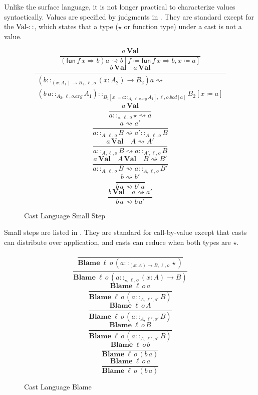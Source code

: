 Unlike the surface language, it is not longer practical to characterize values syntactically.
Values are specified by judgments in . 
They are standard except for the $\operatorname{Val-::}$, which states that a type ($\star$ or function type) under a cast is not a value.

\begin{figure}
\[
\frac{a\,\textbf{Val}}{\left(\mathsf{fun}\,f\,x\Rightarrow b\right)a\rightsquigarrow b\left[f\coloneqq\mathsf{fun}\,f\,x\Rightarrow b,x\coloneqq a\right]}
\]
\[
\frac{b\,\textbf{Val}\quad a\,\textbf{Val}}{\begin{array}{c}
\left(b::_{\left(x:A_{1}\right)\rightarrow B_{1},\ensuremath{\ell},o}\left(x:A_{2}\right)\rightarrow B_{2}\right)a\rightsquigarrow\\
\left(b\,a::_{A_{2},\ell,o.arg}A_{1}\right)::_{B_{1}\left[x\coloneqq a::_{A_{2},\ell,o.arg}A_{1}\right],\ensuremath{\ell},o.bod[a]}B_{2}\left[x\coloneqq a\right]
\end{array}}
\]
\[
\frac{a\,\textbf{Val}}{a::_{\star,\ensuremath{\ell},o}\star\rightsquigarrow a}
\]
\[
\frac{a\rightsquigarrow a'}{a::_{A,\ensuremath{\ell},o}B\rightsquigarrow a'::_{A,\ensuremath{\ell},o}B}
\]
\[
\frac{a\,\textbf{Val}\quad A\rightsquigarrow A'}{a::_{A,\ensuremath{\ell},o}B\rightsquigarrow a::_{A',\ensuremath{\ell},o}B}
\]
\[
\frac{a\,\textbf{Val}\quad A\,\textbf{Val}\quad B\rightsquigarrow B'}{a::_{A,\ensuremath{\ell},o}B\rightsquigarrow a::_{A,\ensuremath{\ell},o}B'}
\]
\[
\frac{b\rightsquigarrow b'}{b\,a\rightsquigarrow b'\,a}
\]
\[
\frac{b\,\textbf{Val}\quad a\rightsquigarrow a'}{b\,a\rightsquigarrow b\,a'}
\]

\caption{Cast Language Small Step}
\label{fig:cast-step}
\end{figure}

Small steps are listed in .
They are standard for call-by-value except that casts can distribute over application, and casts can reduce when both types are $\star$.

\begin{figure}
\[
\frac{\,}{\textbf{Blame}\:\ensuremath{\ell}\,o\,\left(a::_{\left(x:A\right)\rightarrow B,\ensuremath{\ell},o}\star\right)}
\]
\[
\frac{\,}{\textbf{Blame}\:\ensuremath{\ell}\,o\,\left(a::_{\star,\ensuremath{\ell},o}\left(x:A\right)\rightarrow B\right)}
\]
\[
\frac{\textbf{Blame}\:\ensuremath{\ell}\,o\,a}{\textbf{Blame}\:\ensuremath{\ell}\,o\,\left(a::_{A,\ensuremath{\ell'},o'}B\right)}
\]
\[
\frac{\textbf{Blame}\:\ensuremath{\ell}\,o\,A}{\textbf{Blame}\:\ensuremath{\ell}\,o\,\left(a::_{A,\ensuremath{\ell'},o'}B\right)}
\]
\[
\frac{\textbf{Blame}\:\ensuremath{\ell}\,o\,B}{\textbf{Blame}\:\ensuremath{\ell}\,o\,\left(a::_{A,\ensuremath{\ell'},o'}B\right)}
\]
\[
\frac{\textbf{Blame}\:\ensuremath{\ell}\,o\,b}{\textbf{Blame}\:\ensuremath{\ell}\,o\,\left(b\,a\right)}
\]
\[
\frac{\textbf{Blame}\:\ensuremath{\ell}\,o\,a}{\textbf{Blame}\:\ensuremath{\ell}\,o\,\left(b\,a\right)}
\]
\caption{Cast Language Blame}
\label{fig:cast-blame}
\end{figure}

